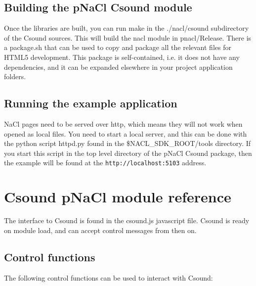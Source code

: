 \documentclass[11pt]{article}
\begin{document}
\subsection{Building the pNaCl Csound module}

Once the libraries are built, you can run make in the ./nacl/csound subdirectory of the Csound sources. This will build the
nacl module in  pnacl/Release. There is a package.sh that can be used to copy and package all the relevant files for 
HTML5 development. This package is self-contained, i.e. it does not have any dependencies, and it can be expanded
elsewhere in your project application folders. 


\subsection{Running the example application}

NaCl pages need to be served over http, which means they will not work when opened as local files. You need to start a local server,
and this can be done with the python script httpd.py found in the \$NACL\_SDK\_ROOT/tools directory. If you start this script 
in the top level directory of the pNaCl Csound package, then the example will be found at the {\tt http://localhost:5103} address.

\section{Csound pNaCl module reference}

The interface to Csound is found in the csound.js javascript file. Csound is ready on module load, and can accept control messages
from then on.

\subsection{Control functions}

The following control functions can be used to interact with Csound:
\end{document}
